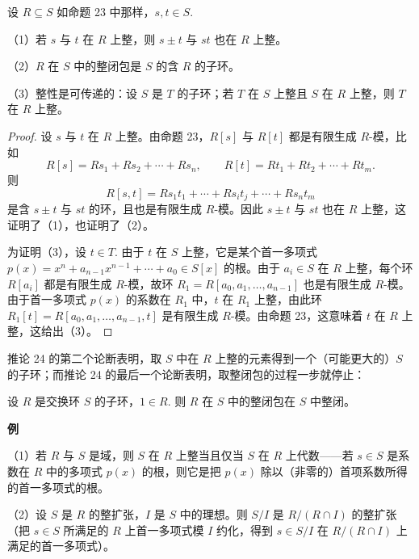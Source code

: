 \begin{corollary}\label{cor:15.24}
设 \(R \subseteq S\) 如命题 23 中那样，\(s, t \in S\).

（1）若 \(s\) 与 \(t\) 在 \(R\) 上整，则 \(s \pm t\) 与 \(st\) 也在 \(R\) 上整。

（2）\(R\) 在 \(S\) 中的整闭包是 \(S\) 的含 \(R\) 的子环。

（3）整性是可传递的：设 \(S\) 是 \(T\) 的子环；若 \(T\) 在 \(S\) 上整且 \(S\) 在 \(R\) 上整，则 \(T\) 在 \(R\) 上整。
\end{corollary}

\begin{proof}
设 \(s\) 与 \(t\) 在 \(R\) 上整。由命题 23，\(R[s]\) 与 \(R[t]\) 都是有限生成 \(R\)-模，比如
\[
R[s] = Rs_1+Rs_2+\cdots+Rs_n, \qquad R[t] = Rt_1+Rt_2+\cdots+Rt_m.
\]
则
\[
R[s,t] = Rs_1t_1+\cdots+Rs_it_j+\cdots+Rs_nt_m
\]
是含 \(s \pm t\) 与 \(st\) 的环，且也是有限生成 \(R\)-模。因此 \(s \pm t\) 与 \(st\) 也在 \(R\) 上整，这证明了（1），也证明了（2）。

为证明（3），设 \(t \in T\). 由于 \(t\) 在 \(S\) 上整，它是某个首一多项式 \(p(x) = x^n+a_{n-1}x^{n-1}+\cdots+a_0 \in S[x]\) 的根。由于 \(a_i \in S\) 在 \(R\) 上整，每个环 \(R[a_i]\) 都是有限生成 \(R\)-模，故环 \(R_1 = R[a_0, a_1, \ldots, a_{n-1}]\) 也是有限生成 \(R\)-模。由于首一多项式 \(p(x)\) 的系数在 \(R_1\) 中，\(t\) 在 \(R_1\) 上整，由此环 \(R_1[t] = R[a_0, a_1, \ldots, a_{n-1}, t]\) 是有限生成 \(R\)-模。由命题 23，这意味着 \(t\) 在 \(R\) 上整，这给出（3）。
\end{proof}

推论 24 的第二个论断表明，取 \(S\) 中在 \(R\) 上整的元素得到一个（可能更大的）\(S\) 的子环；而推论 24 的最后一个论断表明，取整闭包的过程一步就停止：

\begin{corollary}\label{cor:15.25}
设 \(R\) 是交换环 \(S\) 的子环，\(1 \in R\). 则 \(R\) 在 \(S\) 中的整闭包在 \(S\) 中整闭。
\end{corollary}

\noindent\textbf{例}

（1）若 \(R\) 与 \(S\) 是域，则 \(S\) 在 \(R\) 上整当且仅当 \(S\) 在 \(R\) 上代数——若 \(s \in S\) 是系数在 \(R\) 中的多项式 \(p(x)\) 的根，则它是把 \(p(x)\) 除以（非零的）首项系数所得的首一多项式的根。

（2）设 \(S\) 是 \(R\) 的整扩张，\(I\) 是 \(S\) 中的理想。则 \(S/I\) 是 \(R/(R \cap I)\) 的整扩张（把 \(s \in S\) 所满足的 \(R\) 上首一多项式模 \(I\) 约化，得到 \(s \in S/I\) 在 \(R/(R \cap I)\) 上满足的首一多项式）。

